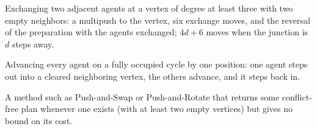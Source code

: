 \item[Swap (primitive)] Exchanging two adjacent agents at a vertex of degree at least three with two empty neighbors: a multipush to the vertex, six exchange moves, and the reversal of the preparation with the agents exchanged; $4d + 6$ moves when the junction is $d$ steps away.
\item[Rotate (primitive)] Advancing every agent on a fully occupied cycle by one position: one agent steps out into a cleared neighboring vertex, the others advance, and it steps back in.
\item[Feasibility solver] A method such as Push-and-Swap or Push-and-Rotate that returns some conflict-free plan whenever one exists (with at least two empty vertices) but gives no bound on its cost.
